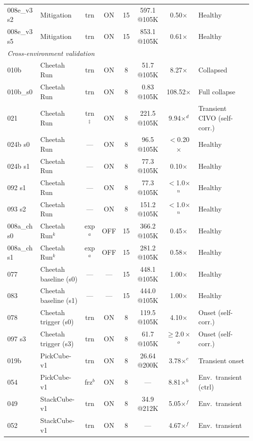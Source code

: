 \begin{table}[t]
\begin{tabular}{llcccccl}
008e\_v3 s2 & Mitigation & trn & ON & 15 & 597.1 @105K & 0.50$\times$ & Healthy \\
008e\_v3 s5 & Mitigation & trn & ON & 15 & 853.1 @105K & 0.61$\times$ & Healthy \\
\midrule
\multicolumn{8}{l}{\textit{Cross-environment validation}} \\
\rowcolor{gray!15}
010b & Cheetah Run & trn & ON & 8 & 51.7 @105K & 8.27$\times$ & Collapsed \\
\rowcolor{gray!15}
010b\_s0 & Cheetah Run & trn & ON & 8 & 0.83 @105K & 108.52$\times$ & Full collapse \\
\rowcolor{gray!15}
021 & Cheetah Run & trn$^\ddagger$ & ON & 8 & 221.5 @105K & 9.94$\times$$^d$ & Transient CIVO (self-corr.) \\
024b s0 & Cheetah Run & --- & ON & 8 & 96.5 @105K & $<$0.20$\times$ & Healthy \\
024b s1 & Cheetah Run & --- & ON & 8 & 77.3 @105K & 0.10$\times$ & Healthy \\
092 s1 & Cheetah Run & --- & ON & 8 & 77.3 @105K & $<$1.0$\times$$^n$ & Healthy \\
093 s2 & Cheetah Run & --- & ON & 8 & 151.2 @105K & $<$1.0$\times$$^n$ & Healthy \\
008a\_ch s0 & Cheetah Run$^k$ & exp$^a$ & OFF & 15 & 366.2 @105K & 0.45$\times$ & Healthy \\
008a\_ch s1 & Cheetah Run$^k$ & exp$^a$ & OFF & 15 & 281.2 @105K & 0.58$\times$ & Healthy \\
077 & Cheetah baseline (s0) & --- & --- & 15 & 448.1 @105K & 1.00$\times$ & Healthy \\
083 & Cheetah baseline (s1) & --- & --- & 15 & 444.0 @105K & 1.00$\times$ & Healthy \\
\rowcolor{gray!15}
078 & Cheetah trigger (s0) & trn & ON & 8 & 119.5 @105K & 4.10$\times$ & Onset (self-corr.) \\
\rowcolor{gray!15}
097 s3 & Cheetah trigger (s3) & trn & ON & 8 & 61.7 @105K & ${\geq}2.0\times$$^o$ & Onset (self-corr.) \\
\rowcolor{gray!15}
019b & PickCube-v1 & trn & ON & 8 & 26.64 @200K & 3.78$\times$$^c$ & Transient onset \\
054 & PickCube-v1 & frz$^b$ & ON & 8 & --- & 8.81$\times$$^h$ & Env.\ transient (ctrl) \\
049 & StackCube-v1 & trn & ON & 8 & 34.9 @212K & 5.05$\times$$^f$ & Env.\ transient \\
052 & StackCube-v1 & trn & ON & 8 & --- & 4.67$\times$$^f$ & Env.\ transient \\

\end{tabular}
\end{table}
